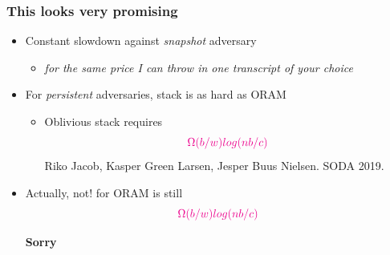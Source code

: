 \documentclass[]{beamer}
\begin{document}
\begin{frame}
\frametitle{This looks very promising}

\begin{itemize}
\item {\color{teal} Constant} slowdown against {\em\color{blue} snapshot} adversary
\begin{itemize}
    \item {\em for the same price I can throw in one transcript of your choice}
\end{itemize}
\item For {\em\color{blue} persistent} adversaries, stack is {\color{teal} as hard as ORAM}
\begin{itemize}
    \item Oblivious stack requires
       $$\color{magenta}\Omega(b/w) log(nb/c)$$
{\color{green} Riko Jacob, Kasper Green Larsen, Jesper Buus Nielsen. SODA 2019.}
\end{itemize}
\pause
\vfill
\item Actually, not! for ORAM is still 
       $$\color{magenta}\Omega(b/w) log(nb/c)$$
\pause

\vskip 1cm
{\color{red}\bf Sorry}
\end{itemize}
\end{frame}
\end{document}
